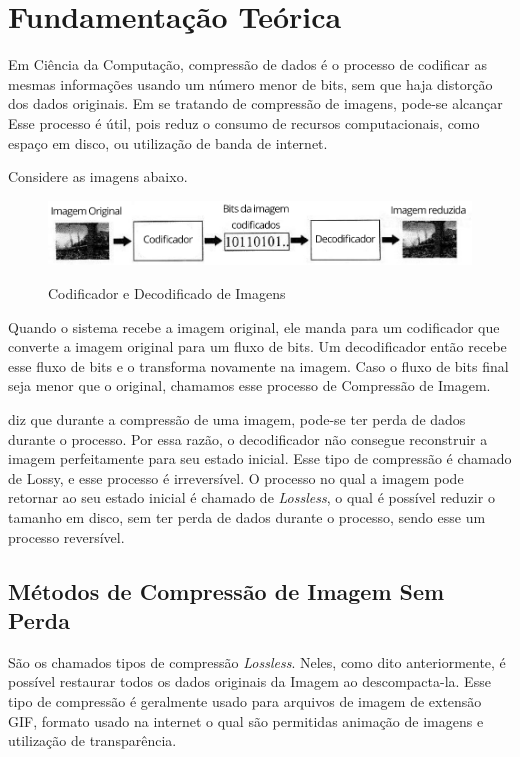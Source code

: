 \chapter{Fundamentação Teórica}
\label{c.fundamentacaoteorica}

Em Ciência da Computação, compressão de dados é o processo de codificar as mesmas informações usando um número menor de bits, sem que haja distorção dos dados originais. Em se tratando de compressão de imagens, pode-se alcançar Esse processo é útil, pois reduz o consumo de recursos computacionais, como espaço em disco, ou utilização de banda de internet.

Considere as imagens abaixo.

\begin{figure}[h]
\caption{\small Codificador e Decodificado de Imagens}
\centering
\includegraphics[scale=0.5]{figs/image_compression.jpg}
\label{f.imagecompressionbasics}
\end{figure}

Quando o sistema recebe a imagem original, ele manda para um codificador que converte a imagem original para um fluxo de bits. Um decodificador então recebe esse fluxo de bits e o transforma novamente na imagem. Caso o fluxo de bits final seja menor que o original, chamamos esse processo de Compressão de Imagem.

\citeauthor{mackenzielossless} diz que durante a compressão de uma imagem, pode-se ter perda de dados durante o processo. Por essa razão, o decodificador não consegue reconstruir a imagem perfeitamente para seu estado inicial. Esse tipo de compressão é chamado de Lossy, e esse processo é irreversível. O processo no qual a imagem pode retornar ao seu estado inicial é chamado de {\em Lossless}, o qual é possível reduzir o tamanho em disco, sem ter perda de dados durante o processo, sendo esse um processo reversível.

\section{Métodos de Compressão de Imagem Sem Perda}
\label{s.lossless}

São os chamados tipos de compressão {\em Lossless}. Neles, como dito anteriormente, é possível restaurar todos os dados originais da Imagem ao descompacta-la. Esse tipo de compressão é geralmente usado para arquivos de imagem de extensão GIF, formato usado na internet o qual são permitidas animação de imagens e utilização de transparência.

